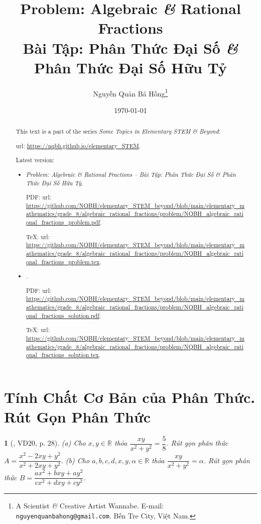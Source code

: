 \documentclass{article}
\title{Problem: Algebraic {\it\&} Rational Fractions\\Bài Tập: Phân Thức Đại Số {\it\&} Phân Thức Đại Số Hữu Tỷ}
\author{Nguyễn Quản Bá Hồng\footnote{A Scientist {\it\&} Creative Artist Wannabe. E-mail: {\tt nguyenquanbahong@gmail.com}. Bến Tre City, Việt Nam.}}
\date{\today}
\newtheorem{baitoan}{}
\begin{document}
\maketitle
\begin{abstract}
	This text is a part of the series {\it Some Topics in Elementary STEM \& Beyond}:
	
	{\sc url}: \url{https://nqbh.github.io/elementary_STEM}.
	
	Latest version:
	\begin{itemize}
		\item {\it Problem: Algebraic \& Rational Fractions -- Bài Tập: Phân Thức Đại Số \& Phân Thức Đại Số Hữu Tỷ}.
		
		PDF: {\sc url}: \url{https://github.com/NQBH/elementary_STEM_beyond/blob/main/elementary_mathematics/grade_8/algebraic_rational_fractions/problem/NQBH_algebraic_rational_fractions_problem.pdf}.
		
		\TeX: {\sc url}: \url{https://github.com/NQBH/elementary_STEM_beyond/blob/main/elementary_mathematics/grade_8/algebraic_rational_fractions/problem/NQBH_algebraic_rational_fractions_problem.tex}.
		\item {\it }.
		
		PDF: {\sc url}: \url{https://github.com/NQBH/elementary_STEM_beyond/blob/main/elementary_mathematics/grade_8/algebraic_rational_fractions/problem/NQBH_algebraic_rational_fractions_solution.pdf}.
		
		\TeX: {\sc url}: \url{https://github.com/NQBH/elementary_STEM_beyond/blob/main/elementary_mathematics/grade_8/algebraic_rational_fractions/problem/NQBH_algebraic_rational_fractions_solution.tex}.
	\end{itemize}
\end{abstract}
\tableofcontents


\section{Tính Chất Cơ Bản của Phân Thức. Rút Gọn Phân Thức}

\begin{baitoan}[\cite{Tuyen_Toan_8}, VD20, p. 28]
	(a) Cho $x,y\in\mathbb{R}$ thỏa $\dfrac{xy}{x^2 + y^2} = \dfrac{5}{8}$. Rút gọn phân thức $A = \dfrac{x^2 - 2xy + y^2}{x^2 + 2xy + y^2}$. (b) Cho $a,b,c,d,x,y,\alpha\in\mathbb{R}$ thỏa $\dfrac{xy}{x^2 + y^2} = \alpha$. Rút gọn phân thức $B = \dfrac{ax^2 + bxy + ay^2}{cx^2 + dxy + cy^2}$.
\end{baitoan}
\end{document}

